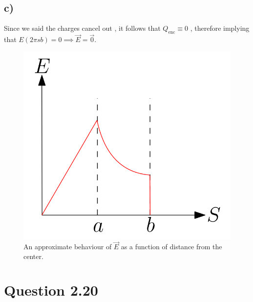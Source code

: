 \documentclass[
	12pt,
	]{article}
\theoremstyle{definition}
\theoremstyle{definition}
\theoremstyle{definition}
\theoremstyle{definition}
\theoremstyle{definition}
\theoremstyle{example}
\theoremstyle{note}
\theoremstyle{remark}
\theoremstyle{example}
\begin{document}
			\subsection*{c) }
				Since we said the charges cancel out , it follows that $Q_{\text{enc}} \equiv 0$ , therefore implying that $E(2\pi sb) =0 \implies \vec{E} = \vec{0}.$
				\begin{figure}[H]
					\centering
					\includegraphics[width=0.5\linewidth]{PHYS350_Ass2_Figure.png}
					\captionsetup{margin=1cm, justification=raggedright}\caption{An approximate behaviour of $\vec{E}$ as a function of distance from the center.}
				\end{figure}
		\section*{Question 2.20}
\end{document}
